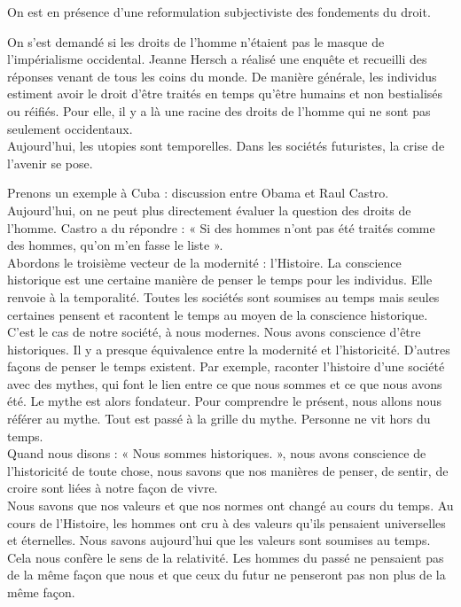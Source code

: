 \documentclass[a4paper,11pt]{article}
\begin{document}
	On est en présence d’une reformulation subjectiviste des fondements du droit.
	
	On s’est demandé si les droits de l’homme n’étaient pas le masque de l’impérialisme occidental. Jeanne Hersch a réalisé une enquête et recueilli des réponses venant de tous les coins du monde. De manière générale, les individus estiment avoir le droit d’être traités en temps qu’être humains et non bestialisés ou réifiés. Pour elle, il y a là une racine des droits de l’homme qui ne sont pas seulement occidentaux.\\

	
	Aujourd’hui, les utopies sont temporelles. Dans les sociétés futuristes, la crise de l’avenir se pose.
		
	Prenons un exemple à Cuba : discussion entre Obama et Raul Castro. Aujourd’hui, on ne peut plus directement évaluer la question des droits de l’homme. Castro a du répondre : « Si des hommes n’ont pas été traités comme des hommes, qu’on m’en fasse le liste ».\\
	
	
	Abordons le troisième vecteur de la modernité : l’Histoire.
	La conscience historique est une certaine manière de penser le temps pour les individus. Elle renvoie à la temporalité. Toutes les sociétés sont soumises au temps mais seules certaines pensent et racontent le temps au moyen de la conscience historique. C’est le cas de notre société, à nous modernes. Nous avons conscience d’être historiques. Il y a presque équivalence entre la modernité et l’historicité. D’autres façons de penser le temps existent. Par exemple, raconter l’histoire d’une société avec des mythes, qui font le lien entre ce que nous sommes et ce que nous avons été. Le mythe est alors fondateur. Pour comprendre le présent, nous allons nous référer au mythe. Tout est passé à la grille du mythe. Personne ne vit hors du temps.\\
	
	
	Quand nous disons : « Nous sommes historiques. », nous avons conscience de l’historicité de toute chose, nous savons que nos manières de penser, de sentir, de croire sont liées à notre façon de vivre.\\
	
	
	Nous savons que nos valeurs et que nos normes ont changé au cours du temps. Au cours de l’Histoire, les hommes ont cru à des valeurs qu’ils pensaient universelles et éternelles. Nous savons aujourd’hui que les valeurs sont soumises au temps. Cela nous confère le sens de la relativité. Les hommes du passé ne pensaient pas de la même façon que nous et que ceux du futur ne penseront pas non plus de la même façon.\\
	
\end{document}
